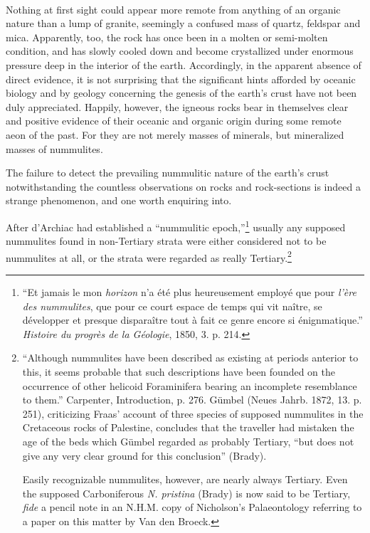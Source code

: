 \documentclass[a4paper, 12pt, oneside]{article}
\begin{document}
\paragraph{}
Nothing at first sight could appear more remote from anything of an organic nature than a lump of granite, seemingly a confused mass of quartz, feldspar and mica. Apparently, too, the rock has once been in a molten or semi-molten condition, and has slowly cooled down and become crystallized under enormous pressure deep in the interior of the earth. Accordingly, in the apparent absence of direct evidence, it is not surprising that the significant hints afforded by oceanic biology and by geology concerning the genesis of the earth's crust have not been duly appreciated. Happily, however, the igneous rocks bear in themselves clear and positive evidence of their oceanic and organic origin during some remote aeon of the past. For they are not merely masses of minerals, but mineralized masses of nummulites.

The failure to detect the prevailing nummulitic nature of the earth's crust notwithstanding the countless observations on rocks and rock-sections is indeed a strange phenomenon, and one worth enquiring into.

After d'Archiac had established a ``nummulitic epoch,''\footnote{``Et jamais le mon \emph{horizon} n'a été plus heureusement employé que pour \emph{l'ère des nummulites}, que pour ce court espace de temps qui vit naître, se développer et presque disparaître tout à fait ce genre encore si énignmatique.'' \emph{Histoire du progrès de la Géologie}, 1850, 3. p. 214.} usually any supposed nummulites found in non-Tertiary strata were either considered not to be nummulites at all, or the strata were regarded as really Tertiary.\footnote{``Although nummulites have been described as existing at periods anterior to this, it seems probable that such descriptions have been founded on the occurrence of other helicoid Foraminifera bearing an incomplete resemblance to them.'' Carpenter, Introduction, p. 276. Gümbel (Neues Jahrb. 1872, 13. p. 251), criticizing Fraas' account of three species of supposed nummulites in the Cretaceous rocks of Palestine, concludes that the traveller had mistaken the age of the beds which Gümbel regarded as probably Tertiary, ``but does not give any very clear ground for this conclusion'' (Brady).

Easily recognizable nummulites, however, are nearly always Tertiary. Even the supposed Carboniferous \emph{N. pristina} (Brady) is now said to be Tertiary, \emph{fide} a pencil note in an N.H.M. copy of Nicholson's Palaeontology referring to a paper on this matter by Van den Broeck.}
\end{document}
